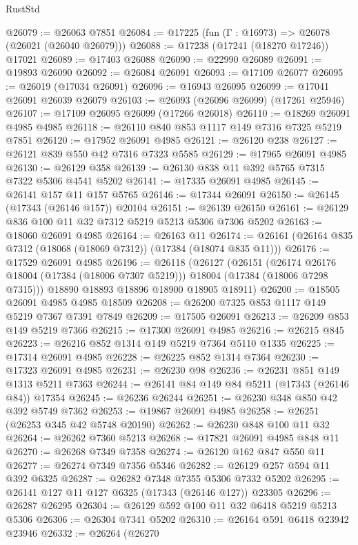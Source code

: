\begin{lexlean}{RustStd}
\begin{coremodule}
@26079 := @26063 @7851
@26084 := @17225 (fun (Γ : @16973) => @26078 (@26021 (@26040 @26079)))
@26088 := @17238 (@17241 (@18270 @17246)) @17021
@26089 := @17403 @26088
@26090 := @22990 @26089
@26091 := @19893 @26090
@26092 := @26084 @26091
@26093 := @17109 @26077
@26095 := @26019 (@17034 @26091)
@26096 := @16943 @26095
@26099 := @17041 @26091 @26039 @26079
@26103 := @26093 (@26096 @26099) (@17261 @25946)
@26107 := @17109 @26095 @26099 (@17266 @26018)
@26110 := @18269 @26091 @4985 @4985
@26118 := @26110 @840 @853 @1117 @149 @7316 @7325 @5219 @7851
@26120 := @17952 @26091 @4985
@26121 := @26120 @238
@26127 := @26121 @839 @550 @42 @7316 @7323 @5585
@26129 := @17965 @26091 @4985
@26130 := @26129 @358
@26139 := @26130 @838 @11 @392 @5765 @7315 @7322 @5306 @4541 @5202
@26141 := @17335 @26091 @4985
@26145 := @26141 @157 @11 @157 @5765
@26146 := @17344 @26091
@26150 := @26145 (@17343 (@26146 @157)) @20104
@26151 := @26139 @26150
@26161 := @26129 @836 @100 @11 @32 @7312 @5219 @5213 @5306 @7306 @5202
@26163 := @18060 @26091 @4985
@26164 := @26163 @11
@26174 := @26161 (@26164 @835 @7312 (@18068 (@18069 @7312)) (@17384 (@18074 @835 @11)))
@26176 := @17529 @26091 @4985
@26196 := @26118
    (@26127
      (@26151
        (@26174 @26176 @18004 (@17384 (@18006 @7307 @5219)))
        @18004
        (@17384 (@18006 @7298 @7315)))
      @18890
      @18893
      @18896
      @18900
      @18905
      @18911)
@26200 := @18505 @26091 @4985 @4985 @18509
@26208 := @26200 @7325 @853 @1117 @149 @5219 @7367 @7391 @7849
@26209 := @17505 @26091
@26213 := @26209 @853 @149 @5219 @7366
@26215 := @17300 @26091 @4985
@26216 := @26215 @845
@26223 := @26216 @852 @1314 @149 @5219 @7364 @5110 @1335
@26225 := @17314 @26091 @4985
@26228 := @26225 @852 @1314 @7364
@26230 := @17323 @26091 @4985
@26231 := @26230 @98
@26236 := @26231 @851 @149 @1313 @5211 @7363
@26244 := @26141 @84 @149 @84 @5211 (@17343 (@26146 @84)) @17354
@26245 := @26236 @26244
@26251 := @26230 @348 @850 @42 @392 @5749 @7362
@26253 := @19867 @26091 @4985
@26258 := @26251 (@26253 @345 @42 @5748 @20190)
@26262 := @26230 @848 @100 @11 @32
@26264 := @26262 @7360 @5213
@26268 := @17821 @26091 @4985 @848 @11
@26270 := @26268 @7349 @7358
@26274 := @26120 @162 @847 @550 @11
@26277 := @26274 @7349 @7356 @5346
@26282 := @26129 @257 @594 @11 @392 @6325
@26287 := @26282 @7348 @7355 @5306 @7332 @5202
@26295 := @26141 @127 @11 @127 @6325 (@17343 (@26146 @127)) @23305
@26296 := @26287 @26295
@26304 := @26129 @592 @100 @11 @32 @6418 @5219 @5213 @5306
@26306 := @26304 @7341 @5202
@26310 := @26164 @591 @6418 @23942 @23946
@26332 := @26264
    (@26270

\end{coremodule}
\end{lexlean}

